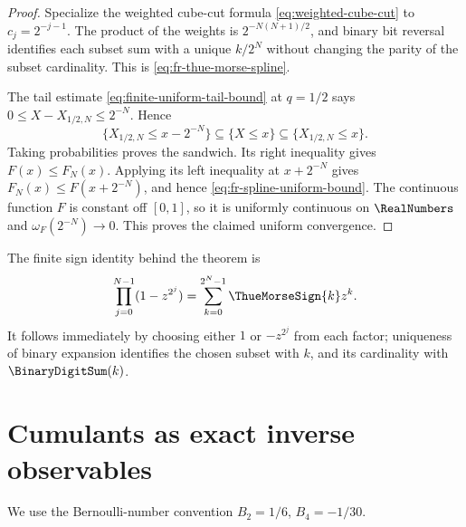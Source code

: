 \begin{proof}
Specialize the weighted cube-cut formula \cref{eq:weighted-cube-cut} to
\(c_j=2^{-j-1}\).  The product of the weights is
\(2^{-N(N+1)/2}\), and binary bit reversal identifies each subset sum with a
unique \(k/2^N\) without changing the parity of the subset cardinality.  This
is \cref{eq:fr-thue-morse-spline}.

The tail estimate \cref{eq:finite-uniform-tail-bound} at \(q=1/2\) says
\(0\le X-X_{1/2,N}\le2^{-N}\).  Hence
\[
 \{X_{1/2,N}\le x-2^{-N}\}
 \subseteq\{X\le x\}
 \subseteq\{X_{1/2,N}\le x\}.
\]
Taking probabilities proves the sandwich.  Its right inequality gives
\(F(x)\le F_N(x)\).  Applying its left inequality at \(x+2^{-N}\) gives
\(F_N(x)\le F(x+2^{-N})\), and hence
\cref{eq:fr-spline-uniform-bound}.  The continuous function \(F\) is constant
off \([0,1]\), so it is uniformly continuous on \(\RealNumbers\) and
\(\omega_F(2^{-N})\to0\).  This proves the claimed uniform convergence.
\end{proof}

The finite sign identity behind the theorem is
\begin{equation}
 \prod_{j=0}^{N-1}(1-z^{2^j})
 =\sum_{k=0}^{2^N-1}\ThueMorseSign{k}z^k.
 \label{eq:fr-thue-morse-product}
\end{equation}
It follows immediately by choosing either \(1\) or \(-z^{2^j}\) from each
factor; uniqueness of binary expansion identifies the chosen subset with
\(k\), and its cardinality with \(\BinaryDigitSum(k)\).

\section{Cumulants as exact inverse observables}
\label{sec:fr-cumulant-recovery}

We use the Bernoulli-number convention \(B_2=1/6\), \(B_4=-1/30\).

